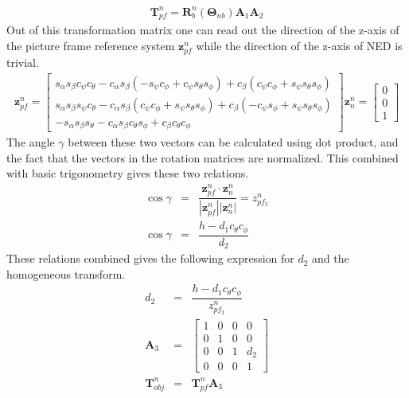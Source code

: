 \begin{eqnarray}
\boldsymbol{T}_{pf}^{n} = \boldsymbol{R}_b^n(\boldsymbol{\Theta} _{nb})\boldsymbol{A}_1\boldsymbol{A}_2
\end{eqnarray}
Out of this transformation matrix one can read out the direction of the z-axis of the picture frame reference system $\boldsymbol{z} _{pf}^n$ while the direction of the z-axis of NED is trivial.
\begin{eqnarray}
\boldsymbol{z}_{pf}^n = \begin{bmatrix}
s_\alpha s_\beta c_\psi c_\theta - c_\alpha s_\beta (-s_\psi c_\phi + c_\psi s_\theta s_\phi) + c_\beta (c_\psi c_\phi + s_\psi s_\theta s_\phi)\\
s_\alpha s_\beta s_\psi c_\theta -c_\alpha s_\beta (c_\psi c_\phi + s_\psi s_\theta s_\phi) + c_\beta (-c_\psi s_\phi + s_\psi s_\theta s_\phi)\\
-s_\alpha s_\beta s_\theta - c_\alpha s_\beta c_\theta s_\phi + c_\beta c_\theta c_\phi
\end{bmatrix}
	\boldsymbol{z}_n^n = \begin{bmatrix}
	0\\0\\1
	\end{bmatrix}
\end{eqnarray}
The angle $\gamma$ between these two vectors can be calculated using dot product, and the fact that the vectors in the rotation matrices are normalized. This combined with basic trigonometry gives these two relations.
\begin{eqnarray}
\cos \gamma &=& \dfrac{\boldsymbol{z}_{pf}^n\cdot \boldsymbol{z}_n^n}{|\boldsymbol{z}_{pf}^n||\boldsymbol{z}_n^n|} = z_{pf_3}^n\\
\cos\gamma &=& \dfrac{h - d_1c_\theta c_\phi}{d_2}
\end{eqnarray}
These relations combined gives the following expression for $d_2$ and the homogeneous transform.
\begin{eqnarray}
d_2 &=& \dfrac{h - d_1c_\theta c_\phi}{z_{pf_3}^n}\\
\boldsymbol{A}_3 &=& \begin{bmatrix}
1 & 0 & 0 & 0\\
0 & 1 & 0 & 0\\
0 & 0 & 1 & d_2\\
0 & 0 & 0 & 1
\end{bmatrix}\\
\boldsymbol{T}_{obj}^n &=& \boldsymbol{T}_{pf}^{n}\boldsymbol{A}_3
\label{T_last}
\end{eqnarray}

